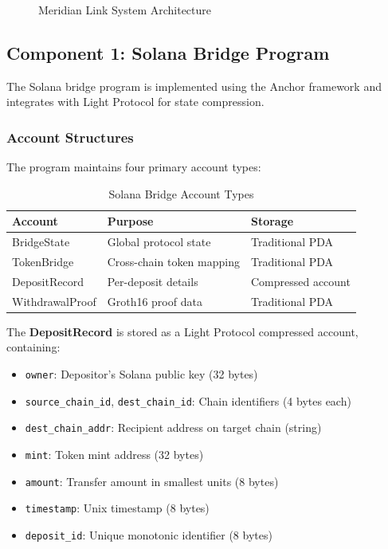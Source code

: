 \documentclass[11pt,a4paper,twoside]{article}
\begin{document}
\begin{figure}[H]
\caption{Meridian Link System Architecture}
\label{fig:architecture}
\end{figure}

\subsection{Component 1: Solana Bridge Program}

The Solana bridge program is implemented using the Anchor framework and integrates with Light Protocol for state compression.

\subsubsection{Account Structures}

The program maintains four primary account types:

\begin{table}[H]
\centering
\caption{Solana Bridge Account Types}
\label{tab:accounts}
\begin{tabular}{@{}lll@{}}
\toprule
\textbf{Account} & \textbf{Purpose} & \textbf{Storage} \\
\midrule
BridgeState & Global protocol state & Traditional PDA \\
TokenBridge & Cross-chain token mapping & Traditional PDA \\
DepositRecord & Per-deposit details & Compressed account \\
WithdrawalProof & Groth16 proof data & Traditional PDA \\
\bottomrule
\end{tabular}
\end{table}

The \textbf{DepositRecord} is stored as a Light Protocol compressed account, containing:
\begin{itemize}
    \item \texttt{owner}: Depositor's Solana public key (32 bytes)
    \item \texttt{source\_chain\_id}, \texttt{dest\_chain\_id}: Chain identifiers (4 bytes each)
    \item \texttt{dest\_chain\_addr}: Recipient address on target chain (string)
    \item \texttt{mint}: Token mint address (32 bytes)
    \item \texttt{amount}: Transfer amount in smallest units (8 bytes)
    \item \texttt{timestamp}: Unix timestamp (8 bytes)
    \item \texttt{deposit\_id}: Unique monotonic identifier (8 bytes)
\end{itemize}
\end{document}
